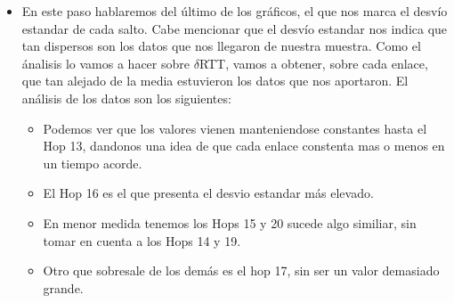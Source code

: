 \begin{itemize}
\begin{itemize}
\item Hop 9 y Hop 11. Como podemos ver, lo que tardan en responder estos enlaces es significativamente alto con respecto a los dem\'as.
\item En menor medida tenemos los Hops 14 y 15, muy parecidos a los 19 y 20. Podemos no considerar a los Hops 14 y 19, dado que fueron productos de dos time outs y su valor no es del todo real.
\item Tambi\'en obtuvimos un enlace, el Hop 16, que respondi\'o bastante m\'as r\'apido que los dem\'as, dado que su resultado es bastante m\'as bajo que el resto.
\end{itemize}
\item En este paso hablaremos del \'ultimo de los gr\'aficos, el que nos marca el desv\'io estandar de cada salto. Cabe mencionar que el desv\'io estandar nos indica que tan dispersos son los datos que nos llegaron de nuestra muestra. Como el \'analisis lo vamos a hacer sobre $\delta$RTT, vamos a obtener, sobre cada enlace, que tan alejado de la media estuvieron los datos que nos aportaron. El an\'alisis de los datos son los siguientes:
\begin{itemize}
\item Podemos ver que los valores vienen manteniendose constantes hasta el Hop 13, dandonos una idea de que cada enlace constenta mas o menos en un tiempo acorde. 
\item El Hop 16 es el que presenta el desvio estandar m\'as elevado.
\item En menor medida tenemos los Hops 15 y 20 sucede algo similiar, sin tomar en cuenta a los Hops 14 y 19.
\item Otro que sobresale de los dem\'as es el hop 17, sin ser un valor demasiado grande.
\end{itemize}
\end{itemize}

